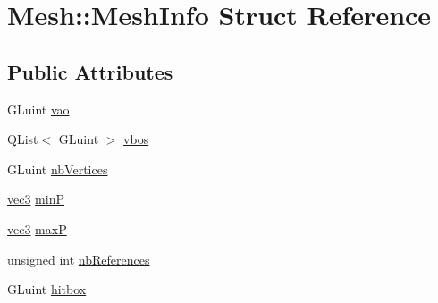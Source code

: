 \hypertarget{struct_mesh_1_1_mesh_info}{\section{Mesh\+:\+:Mesh\+Info Struct Reference}
\label{struct_mesh_1_1_mesh_info}
}
\subsection*{Public Attributes}
\begin{DoxyCompactItemize}
\item 
G\+Luint \hyperlink{struct_mesh_1_1_mesh_info_af15096e0f0aa61fff7d8a1c223e547cf}{vao}
\item 
Q\+List$<$ G\+Luint $>$ \hyperlink{struct_mesh_1_1_mesh_info_ad360b326ff7424dc9b6a3f6614af895d}{vbos}
\item 
G\+Luint \hyperlink{struct_mesh_1_1_mesh_info_a8869e5c769b3895876e32bed8252dffd}{nb\+Vertices}
\item 
\hyperlink{structvec3}{vec3} \hyperlink{struct_mesh_1_1_mesh_info_add150c6f037445254a0ebee99abf3ba9}{min\+P}
\item 
\hyperlink{structvec3}{vec3} \hyperlink{struct_mesh_1_1_mesh_info_a1a3ed73fec39d12cf5fcd1dd554c2dea}{max\+P}
\item 
unsigned int \hyperlink{struct_mesh_1_1_mesh_info_a8e32fc200e5ed8af32c409cac7b17342}{nb\+References}
\item 
G\+Luint \hyperlink{struct_mesh_1_1_mesh_info_a325c495a1c63762bac63b3df9c9dfebf}{hitbox}
\end{DoxyCompactItemize}


